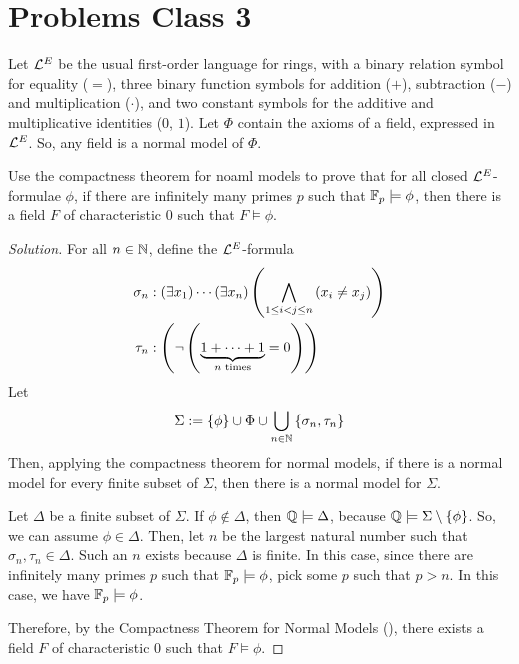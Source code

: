 \section*{Problems Class 3}
\addtocounter{PC}{1}

\begin{boxproblem}
    Let $\mathcal{L}^{E}$ be the usual first-order language for rings, with a binary relation symbol for equality ($=$), three binary function symbols for addition ($+$), subtraction ($-$) and multiplication ($\cdot$), and two constant symbols for the additive and multiplicative identities ($0$, $1$). Let $\Phi$ contain the axioms of a field, expressed in $\mathcal{L}^{E}$. So, any field is a normal model of $\Phi$. \newline

    Use the compactness theorem for noaml models to prove that for all closed $\mathcal{L}^{E}$-formulae $\phi$, if there are infinitely many primes $p$ such that $\mathbb{F}_p \models \phi$, then there is a field $F$ of characteristic $0$ such that $F \models \phi$.
\end{boxproblem}
\begin{proof}[Solution]
    For all $n \in \mathbb{N}$, define the $\mathcal{L}^{E}$-formula
    \begin{align*}
        \sigma_n &: \left( \exists x_1 \right)\cdots\left( \exists x_n \right)\left( \bigwedge_{1 \leq i < j \leq n} \left( x_i \neq x_j \right) \right) \\
        \tau_{n} &: \left( \neg \left( \underbrace{1 + \cdots + 1}_{n \text{ times}} = 0 \right) \right)
    \end{align*}
    Let 
    \begin{align*}
        \Sigma := \left\{ \phi \right\} \cup \Phi \cup \bigcup_{n \in \mathbb{N}} \left\{ \sigma_n, \tau_n \right\}
    \end{align*}
    Then, applying the compactness theorem for normal models, if there is a normal model for every finite subset of $\Sigma$, then there is a normal model for $\Sigma$.

    Let $\Delta$ be a finite subset of $\Sigma$. If $\phi \notin \Delta$, then $\mathbb{Q} \models \Delta$, because $\mathbb{Q} \models \Sigma \setminus \left\{ \phi \right\}$. So, we can assume $\phi \in \Delta$. Then, let $n$ be the largest natural number such that $\sigma_n, \tau_n \in \Delta$. Such an $n$ exists because $\Delta$ is finite. In this case, since there are infinitely many primes $p$ such that $\mathbb{F}_p \models \phi$, pick some $p$ such that $p > n$. In this case, we have $\mathbb{F}_p \models \phi$.

    Therefore, by the Compactness Theorem for Normal Models (), there exists a field $F$ of characteristic $0$ such that $F \models \phi$.
\end{proof}